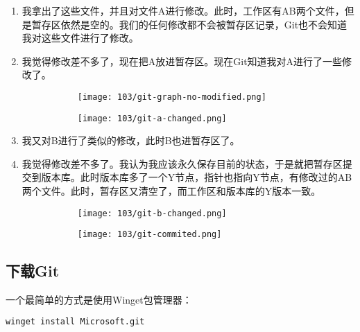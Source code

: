\begin{enumerate}
  \item 我拿出了这些文件，并且对文件A进行修改。此时，工作区有AB两个文件，但是暂存区依然是空的。我们的任何修改都不会被暂存区记录，Git也不会知道我对这些文件进行了修改。

  \item 我觉得修改差不多了，现在把A放进暂存区。现在Git知道我对A进行了一些修改了。
    \begin{figure}[ht]
      \begin{subfigure}[t]{0.45\linewidth}
        \centering
        \texttt{[image: 103/git-graph-no-modified.png]}
      \end{subfigure}
      \hfill               %
      \begin{subfigure}[t]{0.45\linewidth}
        \centering
        \texttt{[image: 103/git-a-changed.png]}
      \end{subfigure}
    \end{figure}
  \item 我又对B进行了类似的修改，此时B也进暂存区了。
  \item 我觉得修改差不多了。我认为我应该永久保存目前的状态，于是就把暂存区提交到版本库。此时版本库多了一个Y节点，指针也指向Y节点，有修改过的AB两个文件。此时，暂存区又清空了，而工作区和版本库的Y版本一致。
    \begin{figure}[ht]
      \begin{subfigure}[t]{0.45\linewidth}
        \centering
        \texttt{[image: 103/git-b-changed.png]}
      \end{subfigure}
      \hfill               %
      \begin{subfigure}[t]{0.45\linewidth}
        \centering
        \texttt{[image: 103/git-commited.png]}
      \end{subfigure}
    \end{figure}
\end{enumerate}

\subsection{下载Git}

一个最简单的方式是使用Winget包管理器：

\begin{lstlisting}[language=bash]
    winget install Microsoft.git
\end{lstlisting}

